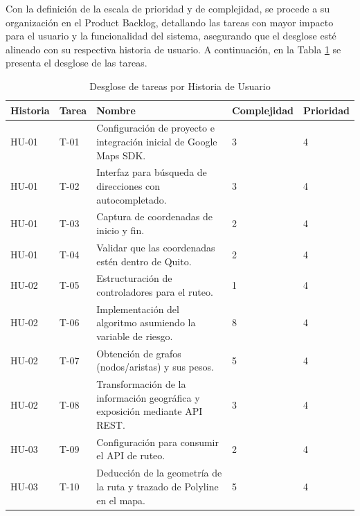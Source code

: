 Con la definición de la escala de prioridad y de complejidad, se procede a su organización en el Product Backlog, detallando las tareas con mayor impacto para el usuario y la funcionalidad del sistema, asegurando que el desglose esté alineado con su respectiva historia de usuario. A continuación, en la Tabla \ref{tab:desglose-tareas} se presenta el desglose de las tareas.

\begin{longtable}{|p{2cm}|p{2cm}|p{5cm}|p{2.2cm}|p{2.2cm}|}
\caption{Desglose de tareas por Historia de Usuario}
\label{tab:desglose-tareas} \\
\hline
\textbf{Historia} & \textbf{Tarea} & \textbf{Nombre} & \textbf{Complejidad} & \textbf{Prioridad} \\
\hline
\endfirsthead
\hline
\endhead
\hline
\endfoot
\endlastfoot

HU-01 & T-01 &
Configuración de proyecto e integración inicial de Google Maps SDK. &
3 & 4 \\ \hline

HU-01 & T-02 &
Interfaz para búsqueda de direcciones con autocompletado. &
3 & 4 \\ \hline

HU-01 & T-03 &
Captura de coordenadas de inicio y fin. &
2 & 4 \\ \hline

HU-01 & T-04 &
Validar que las coordenadas estén dentro de Quito. &
2 & 4 \\ \hline

HU-02 & T-05 &
Estructuración de controladores para el ruteo. &
1 & 4 \\ \hline

HU-02 & T-06 &
Implementación del algoritmo asumiendo la variable de riesgo. &
8 & 4 \\ \hline

HU-02 & T-07 &
Obtención de grafos (nodos/aristas) y sus pesos. &
5 & 4 \\ \hline

HU-02 & T-08 &
Transformación de la información geográfica y exposición mediante API REST. &
3 & 4 \\ \hline

HU-03 & T-09 &
Configuración para consumir el API de ruteo. &
2 & 4 \\ \hline

HU-03 & T-10 &
Deducción de la geometría de la ruta y trazado de Polyline en el mapa. &
5 & 4 \\ \hline


\end{longtable}
